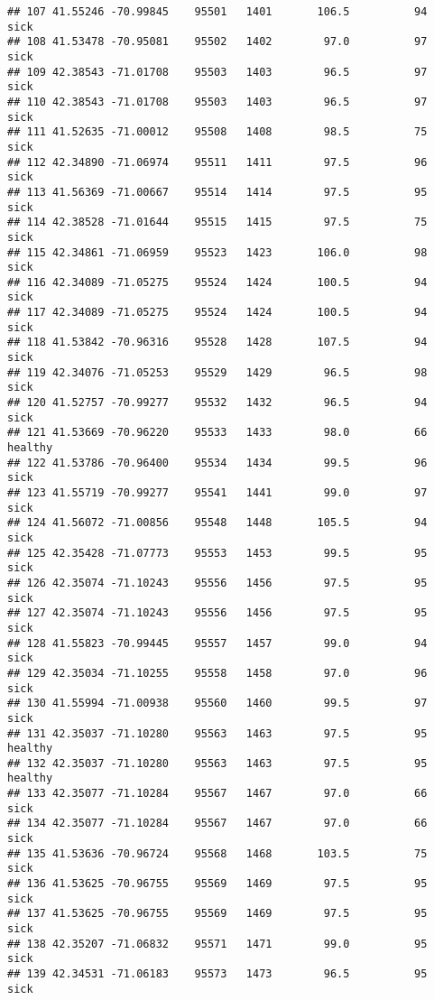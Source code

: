\documentclass[
]{article}
\begin{document}
\begin{verbatim}
## 107 41.55246 -70.99845    95501   1401       106.5          94         sick
## 108 41.53478 -70.95081    95502   1402        97.0          97         sick
## 109 42.38543 -71.01708    95503   1403        96.5          97         sick
## 110 42.38543 -71.01708    95503   1403        96.5          97         sick
## 111 41.52635 -71.00012    95508   1408        98.5          75         sick
## 112 42.34890 -71.06974    95511   1411        97.5          96         sick
## 113 41.56369 -71.00667    95514   1414        97.5          95         sick
## 114 42.38528 -71.01644    95515   1415        97.5          75         sick
## 115 42.34861 -71.06959    95523   1423       106.0          98         sick
## 116 42.34089 -71.05275    95524   1424       100.5          94         sick
## 117 42.34089 -71.05275    95524   1424       100.5          94         sick
## 118 41.53842 -70.96316    95528   1428       107.5          94         sick
## 119 42.34076 -71.05253    95529   1429        96.5          98         sick
## 120 41.52757 -70.99277    95532   1432        96.5          94         sick
## 121 41.53669 -70.96220    95533   1433        98.0          66      healthy
## 122 41.53786 -70.96400    95534   1434        99.5          96         sick
## 123 41.55719 -70.99277    95541   1441        99.0          97         sick
## 124 41.56072 -71.00856    95548   1448       105.5          94         sick
## 125 42.35428 -71.07773    95553   1453        99.5          95         sick
## 126 42.35074 -71.10243    95556   1456        97.5          95         sick
## 127 42.35074 -71.10243    95556   1456        97.5          95         sick
## 128 41.55823 -70.99445    95557   1457        99.0          94         sick
## 129 42.35034 -71.10255    95558   1458        97.0          96         sick
## 130 41.55994 -71.00938    95560   1460        99.5          97         sick
## 131 42.35037 -71.10280    95563   1463        97.5          95      healthy
## 132 42.35037 -71.10280    95563   1463        97.5          95      healthy
## 133 42.35077 -71.10284    95567   1467        97.0          66         sick
## 134 42.35077 -71.10284    95567   1467        97.0          66         sick
## 135 41.53636 -70.96724    95568   1468       103.5          75         sick
## 136 41.53625 -70.96755    95569   1469        97.5          95         sick
## 137 41.53625 -70.96755    95569   1469        97.5          95         sick
## 138 42.35207 -71.06832    95571   1471        99.0          95         sick
## 139 42.34531 -71.06183    95573   1473        96.5          95         sick

\end{verbatim}
\end{document}
